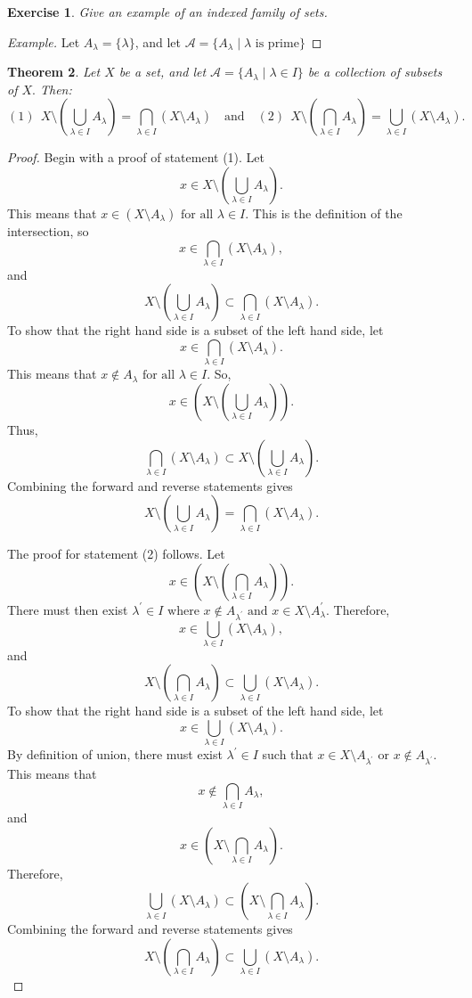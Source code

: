 \documentclass{amsart}
\newtheorem{theorem}{Theorem}
\newtheorem{exercise}[theorem]{Exercise}
\newcommand{\1}{\mathds{1}}
\numberwithin{equation}{section}
\numberwithin{theorem}{section}
\begin{document}
\begin{exercise}
	Give an example of an indexed family of sets.
	
\end{exercise}

\begin{proof}[Example]
	Let $A_\lambda = \{\lambda\}$, and let $\mathcal{A} = \{A_\lambda\mid \lambda \text{ is prime}\}$
\end{proof}

\begin{theorem} 
Let $X$ be a set, and let  $\mathcal{A}=\{A_\lambda\mid \lambda\in I\}$ be a collection of subsets of $X.$ Then:
\[
	(1) \ \ X\setminus \left( \bigcup_{\lambda\in I}A_\lambda\right) =\bigcap_{\lambda\in I} (X\setminus A_\lambda)
	\quad\text{and}\quad
	(2) \ \ X\setminus \left( \bigcap_{\lambda\in I}A_\lambda\right)  =\bigcup_{\lambda\in I} (X\setminus A_\lambda).
\]
\end{theorem}

\begin{proof}
		
	Begin with a proof of statement (1). Let $$x\in X\setminus(\bigcup_{\lambda\in I}A_\lambda).$$ This means that $x\in (X\setminus A_\lambda)\text{ for all } \lambda\in I$. This is the definition of the intersection, so $$x\in \bigcap_{\lambda\in I} (X\setminus A_\lambda),$$ and  $$X\setminus \left( \bigcup_{\lambda\in I}A_\lambda\right)\subset \bigcap_{\lambda\in I} (X\setminus A_\lambda).$$ 
	To show that the right hand side is a subset of the left hand side, let $$x\in \bigcap_{\lambda\in I} (X\setminus A_\lambda).$$ This means that $x\notin A_\lambda\text{ for all } \lambda\in I$. So, $$x\in (X\setminus(\bigcup_{\lambda\in I}A_\lambda)).$$ Thus, $$\bigcap_{\lambda\in I} (X\setminus A_\lambda)\subset X\setminus(\bigcup_{\lambda\in I}A_\lambda).$$ Combining the forward and reverse statements gives $$X\setminus \left( \bigcup_{\lambda\in I}A_\lambda\right) =\bigcap_{\lambda\in I} (X\setminus A_\lambda).$$
		
	The proof for statement (2) follows. Let $$x\in (X\setminus(\bigcap_{\lambda\in I}A_\lambda)).$$ There must then exist $\lambda^\prime\in I \text{ where } x\notin A_{\lambda^\prime}\text{ and } x\in X\setminus A_\lambda^\prime$. Therefore, $$x\in\bigcup_{\lambda\in I}(X\setminus A_\lambda), $$and $$X\setminus(\bigcap_{\lambda\in I}A_\lambda)\subset \bigcup_{\lambda\in I}(X\setminus A_\lambda).$$ 
	To show that the right hand side is a subset of the left hand side, let $$x\in \bigcup_{\lambda\in I}(X\setminus A_\lambda).$$ By definition of union, there must exist $\lambda^\prime\in I$ such that $x\in X\setminus A_{\lambda^\prime} \text{ or } x\notin A_{\lambda^\prime}$. This means that $$x\notin \bigcap_{\lambda\in I}A_\lambda,$$ and $$x\in (X\setminus \bigcap_{\lambda\in I}A_\lambda).$$ Therefore, $$\bigcup_{\lambda\in I}(X\setminus A_\lambda)\subset (X\setminus \bigcap_{\lambda\in I}A_\lambda).$$ Combining the forward and reverse statements gives $$X\setminus(\bigcap_{\lambda\in I}A_\lambda)\subset \bigcup_{\lambda\in I}(X\setminus A_\lambda).$$
\end{proof}
\end{document}
